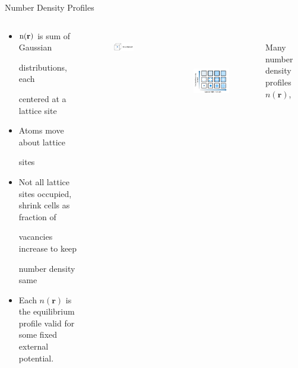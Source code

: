 \documentclass{beamer}
\renewcommand{\vec}[1]{\mathbf{#1}}
\begin{document}
\begin{frame}{Number Density Profiles}
	\begin{columns}[t]
	    \vspace{-2em}
        \begin{block}{}
            \begin{itemize}
            \item $\text n(\vec{r})$ is sum of Gaussian 
            
            distributions, each  
            
            centered at a lattice site
            \item Atoms move about lattice
            
            sites %
            \item Not all lattice sites occupied,
            shrink cells as fraction of 
            
            vacancies increase to keep 
            
            number density same
            \item Each $n(\vec r)$ is the equilibrium profile
            valid for some fixed external potential. 
            
            \end{itemize}
        \end{block}
		\vspace{-2.5em}
		    \begin{figure}
               \includegraphics[height=1.5cm]{figs/Simplified_cell.pdf}
            \end{figure}
    \normalsize
             \vspace{-2em} 
    	    \begin{figure}
               \centering
               \includegraphics[height=4.5cm]{VaryWidthandVacancies}
            \end{figure} 
             \vspace{-0.5em} 
                \footnotesize
    $~~~~~~~~~~$Many number density profiles $n(\vec r)$, 
    

\end{columns}
\end{frame}
\end{document}
